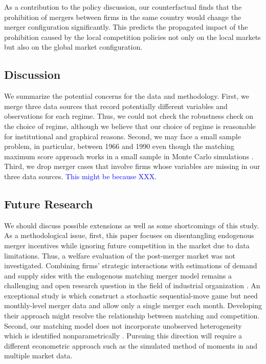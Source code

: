 \documentclass[10pt]{article}
\begin{document}
As a contribution to the policy discussion, our counterfactual finds that the prohibition of mergers between firms in the same country would change the merger configuration significantly. This predicts the propagated impact of the prohibition caused by the local competition policies not only on the local markets but also on the global market configuration.


\subsection{Discussion}
We summarize the potential concerns for the data and methodology. 
First, we merge three data sources that record potentially different variables and observations for each regime. 
Thus, we could not check the robustness check on the choice of regime, although we believe that our choice of regime is reasonable for institutional and graphical reasons.
Second, we may face a small sample problem, in particular, between 1966 and 1990 even though the matching maximum score approach works in a small sample in Monte Carlo simulations \citep{akkus2015ms,otani2021matching_cost}.
Third, we drop merger cases that involve firms whose variables are missing in our three data sources. 
\textcolor{blue}{This might be because XXX.}


\subsection{Future Research}

We should discuss possible extensions as well as some shortcomings of this study. 
As a methodological issue, first, this paper focuses on disentangling endogenous merger incentives while ignoring future competition in the market due to data limitations. 
Thus, a welfare evaluation of the post-merger market was not investigated.
Combining firms' strategic interactions with estimations of demand and supply sides with the endogenous matching merger model remains a challenging and open research question in the field of industrial organization \citep{agarwal2021market}. 
An exceptional study is \cite{igami2019mergers} which construct a stochastic sequential-move game but need monthly-level merger data and allow only a single merger each month. 
Developing their approach might resolve the relationship between matching and competition.
Second, our matching model does not incorporate unobserved heterogeneity which is identified nonparametrically \citep{fox2018jpe}.
Pursuing this direction will require a different econometric approach such as the simulated method of moments in \cite{fox2018jpe} and multiple market data. 
\end{document}
